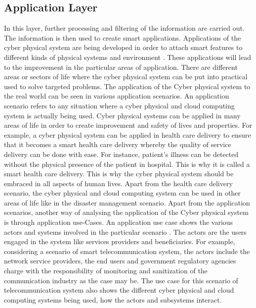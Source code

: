 \documentclass[english]{lni}
\begin{document}
\subsection{Application Layer}
 In this layer, further processing and filtering of the information are carried out. The information is then used  to create smart applications. Applications of the cyber physical system are being developed in order to attach smart features to different kinds of physical systems and environment \cite{b2}. These applications will lead to the improvement in the particular areas of application. There are different areas or sectors of life where the cyber physical system can be put into practical used to solve targeted  problems. The application of the Cyber physical system to the real world  can be seen in various application scenarios. An application scenario refers to any situation where a cyber physical  and cloud computing system is actually being used. Cyber physical systems can be applied in many areas of life in order to create improvement and safety of lives and properties. For example, a cyber physical system can be applied in health care delivery to ensure that it becomes a smart health care delivery whereby the quality of service delivery can be done with ease. For instance, patient's illness can be detected without the physical presence of the patient in hospital. This is why it is called a smart health care delivery. This is why the cyber physical system should be embraced in all aspects of human lives. Apart from the health care delivery scenario, the cyber physical and cloud computing system can be used in other areas of life like in the disaster management scenario. Apart from the application scenarios, another way of analysing the application of the Cyber physical system is through application use-Cases. An application use case shows the various actors  and systems involved in the particular scenario \cite{a7}. The actors are the users engaged in the system like services providers and beneficiaries. For example, considering a scenario of smart telecommunication system, the actors include the network service providers, the end users and government regulatory agencies charge with the responsibility of monitoring and sanitization of the communication industry as the case may be. The use case for this scenario of telecommunication system also shows the different cyber physical and cloud computing  systems being used, how the actors and subsystems interact.

\end{document}
